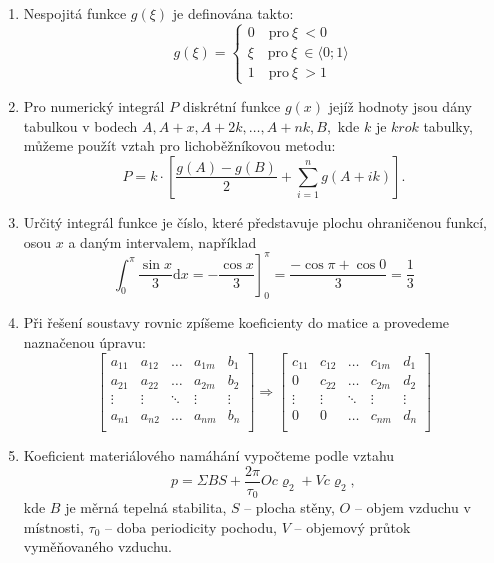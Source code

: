 \documentclass{article}
\begin{document}
\begin{enumerate}
\item Nespojitá funkce $g(\xi)$ je definována takto:
$$g(\xi) = \left \{
  \begin{array}{l}
  0\quad \mbox{pro}\ \xi\ < 0\\
  \xi \quad \mbox{pro}\ \xi\ \in \langle 0; 1\rangle\\
  1\quad \mbox{pro}\ \xi\ > 1
  \end{array}
\right.$$

\item Pro numerický integrál $P$ diskrétní funkce $g(x)$ jejíž hodnoty jsou dány tabulkou v bodech $A,A + x,A + 2k,\ldots,A + nk,B,$ kde $k$ je $krok$ tabulky, můžeme použít vztah pro lichoběžníkovou metodu:
\begin{equation}
P = k\cdot \left[ \frac{g(A) - g(B)}{2} + \sum_{i=1}^n g(A + ik)\right].
\end{equation}

\item Určitý integrál funkce je číslo, které představuje plochu ohraničenou funkcí, osou $x$ a daným intervalem, například
$$\left.\int_0^\pi \frac{\sin x}{3}\mbox{d}x = - \frac{\cos x}{3}\right]_0^\pi = \frac{ - \cos \pi + \cos 0}{3} = \frac{1}{3}$$

\item Při řešení soustavy rovnic zpíšeme koeficienty do matice a provedeme naznačenou úpravu:
$$\left[ \begin{array}{cccc|c}
a_{11} & a_{12} & \ldots & a_{1m} & b_{1}\\
a_{21} & a_{22} & \ldots & a_{2m} & b_{2}\\
\vdots & \vdots & \ddots & \vdots & \vdots\\
a_{n1} & a_{n2} & \ldots & a_{nm} & b_{n}\\
\end{array} \right]
\Longrightarrow
\left[ \begin{array}{cccc|c}
c_{11} & c_{12} & \ldots & c_{1m} & d_{1}\\
0      & c_{22} & \ldots & c_{2m} & d_{2}\\
\vdots & \vdots & \ddots & \vdots & \vdots\\
0      & 0      & \ldots & c_{nm} & d_{n}\\
\end{array} \right]$$

\item Koeficient materiálového namáhání vypočteme podle vztahu
\begin{equation}
p = \Sigma BS + \frac{2 \pi}{\tau_0}Oc \varrho_2 +Vc \varrho_2,
\end{equation}
kde $B$ je měrná tepelná stabilita, $S$ -- plocha stěny, $O$ -- objem vzduchu v místnosti, $\tau_0$ -- doba periodicity pochodu, $V$ -- objemový průtok vyměňovaného vzduchu.

\end{enumerate}
\end{document}
